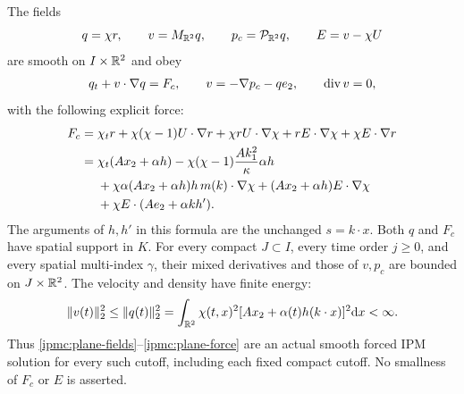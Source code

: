 \begin{proposition}\label{ipmc:plane}
The fields
\begin{equation}\label{ipmc:plane-fields}
q=\chi r,\qquad v=M_{\mathbb R^2}q,\qquad
p_c=\mathcal P_{\mathbb R^2}q,\qquad E=v-\chi U
\end{equation}
are smooth on $I\times\mathbb R^2$ and obey
\begin{equation}\label{ipmc:plane-pde}
q_t+v\cdot\nabla q=F_c,\qquad
v=-\nabla p_c-qe_2,\qquad \operatorname{div} v=0,
\end{equation}
with the following explicit force:
\begin{align}\label{ipmc:plane-force}
F_c={}&\chi_t r+\chi(\chi-1)U\cdot\nabla r
+\chi r U\cdot\nabla\chi+rE\cdot\nabla\chi+\chi E\cdot\nabla r\\
={}&\chi_t(Ax_2+\alpha h)
-\chi(\chi-1)\frac{Ak_1^2}{\kappa}\alpha h\notag\\
&+\chi\alpha(Ax_2+\alpha h)h\,m(k)\cdot\nabla\chi
+(Ax_2+\alpha h)E\cdot\nabla\chi\notag\\
&+\chi E\cdot(Ae_2+\alpha k h').\notag
\end{align}
The arguments of $h,h'$ in this formula are the unchanged $s=k\cdot x$.
Both $q$ and $F_c$ have spatial support in $K$.
For every compact $J\subset I$, every time order $j\ge0$, and every spatial
multi-index $\gamma$, their mixed derivatives and those of $v,p_c$ are
bounded on $J\times\mathbb R^2$. The velocity and density have finite energy:
\begin{equation}\label{ipmc:plane-energy}
\|v(t)\|_2^2\le\|q(t)\|_2^2
=\int_{\mathbb R^2}\chi(t,x)^2
       [Ax_2+\alpha(t)h(k\cdot x)]^2\mathrm d x<\infty.
\end{equation}
Thus \eqref{ipmc:plane-fields}--\eqref{ipmc:plane-force} are an actual
smooth forced IPM solution for every such cutoff, including each fixed
compact cutoff. No smallness of $F_c$ or $E$ is asserted.
\end{proposition}
